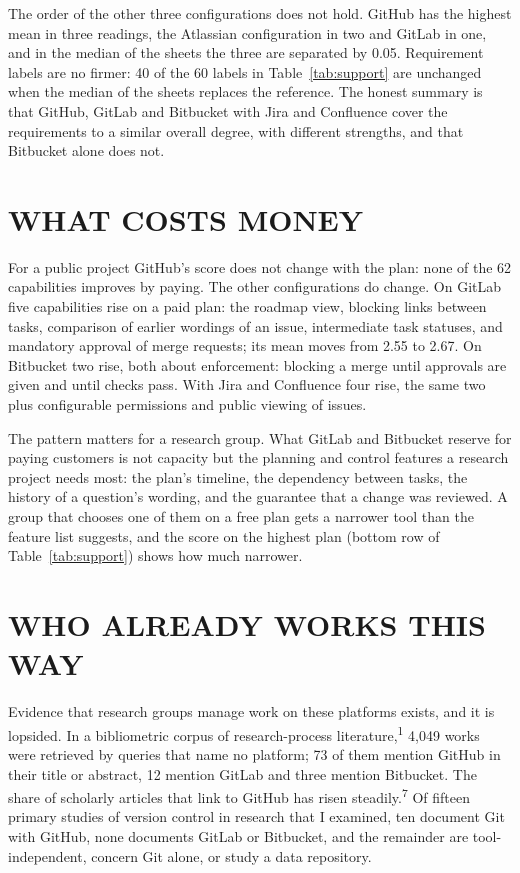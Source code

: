 \documentclass{IEEEcsmag}
\begin{document}
The order of the other three configurations does not hold. GitHub has the highest mean in three readings, the Atlassian configuration in two and GitLab in one, and in the median of the sheets the three are separated by 0.05. Requirement labels are no firmer: 40 of the 60 labels in Table~\ref{tab:support} are unchanged when the median of the sheets replaces the reference. The honest summary is that GitHub, GitLab and Bitbucket with Jira and Confluence cover the requirements to a similar overall degree, with different strengths, and that Bitbucket alone does not.

\section{WHAT COSTS MONEY}

For a public project GitHub's score does not change with the plan: none of the 62 capabilities improves by paying. The other configurations do change. On GitLab five capabilities rise on a paid plan: the roadmap view, blocking links between tasks, comparison of earlier wordings of an issue, intermediate task statuses, and mandatory approval of merge requests; its mean moves from 2.55 to 2.67. On Bitbucket two rise, both about enforcement: blocking a merge until approvals are given and until checks pass. With Jira and Confluence four rise, the same two plus configurable permissions and public viewing of issues.

The pattern matters for a research group. What GitLab and Bitbucket reserve for paying customers is not capacity but the planning and control features a research project needs most: the plan's timeline, the dependency between tasks, the history of a question's wording, and the guarantee that a change was reviewed. A group that chooses one of them on a free plan gets a narrower tool than the feature list suggests, and the score on the highest plan (bottom row of Table~\ref{tab:support}) shows how much narrower.

\section{WHO ALREADY WORKS THIS WAY}

Evidence that research groups manage work on these platforms exists, and it is lopsided. In a bibliometric corpus of research-process literature,\textsuperscript{1} 4{,}049 works were retrieved by queries that name no platform; 73 of them mention GitHub in their title or abstract, 12 mention GitLab and three mention Bitbucket. The share of scholarly articles that link to GitHub has risen steadily.\textsuperscript{7} Of fifteen primary studies of version control in research that I examined, ten document Git with GitHub, none documents GitLab or Bitbucket, and the remainder are tool-independent, concern Git alone, or study a data repository.
\end{document}
